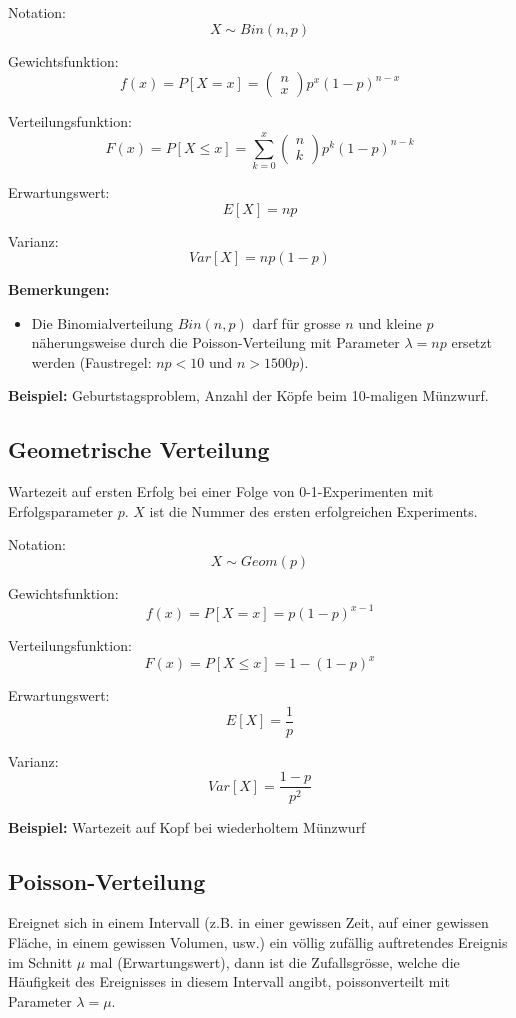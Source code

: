 \documentclass[10pt,a4paper,twocolumn]{article}
\begin{document}
\vspace{10pt}

Notation:
\[
X \sim Bin(n,p)
\]

Gewichtsfunktion:
\[
f(x)=P[X=x]=
\left(
	\begin{array}{c}
		n \\
		x
	\end{array}
\right)
p^x(1-p)^{n-x}
\]

Verteilungsfunktion:
\[
F(x)=P[X \leq x]=\sum \limits_{k=0}^x 
\left(
	\begin{array}{c}
		n \\
		k
	\end{array}
\right)
p^k(1-p)^{n-k}
\]

Erwartungswert:
\[
E[X]=np
\]

Varianz:
\[
Var[X]=np(1-p)
\]

\textbf{Bemerkungen:}
\begin{itemize}
\item Die Binomialverteilung $Bin(n,p)$ darf für grosse $n$ und kleine $p$ näherungsweise durch die Poisson-Verteilung mit Parameter $\lambda = np$ ersetzt werden (Faustregel: $np<10$ und $n>1500p$).
\end{itemize}

\textbf{Beispiel:} Geburtstagsproblem, Anzahl der Köpfe beim 10-maligen Münzwurf.

\subsection{Geometrische Verteilung}
Wartezeit auf ersten Erfolg bei einer Folge von 0-1-Experimenten mit Erfolgsparameter $p$. $X$ ist die Nummer des ersten erfolgreichen Experiments.

\vspace{10pt}

Notation:
\[
X \sim Geom(p)
\]

Gewichtsfunktion:
\[
f(x)=P[X=x]=p(1-p)^{x-1}
\]

Verteilungsfunktion:
\[
F(x)=P[X \leq x]=1-(1-p)^{x}
\]

Erwartungswert:
\[
E[X]=\frac{1}{p}
\]

Varianz:
\[
Var[X]=\frac{1-p}{p^2}
\]

\textbf{Beispiel:} Wartezeit auf Kopf bei wiederholtem Münzwurf

\subsection{Poisson-Verteilung}
Ereignet sich in einem Intervall (z.B. in einer gewissen Zeit, auf einer gewissen Fläche, in einem gewissen Volumen, usw.) ein völlig zufällig auftretendes Ereignis im Schnitt $\mu$ mal (Erwartungswert), dann ist die Zufallsgrösse, welche die Häufigkeit des Ereignisses in diesem Intervall angibt, poissonverteilt mit Parameter $\lambda=\mu$.
\end{document}
